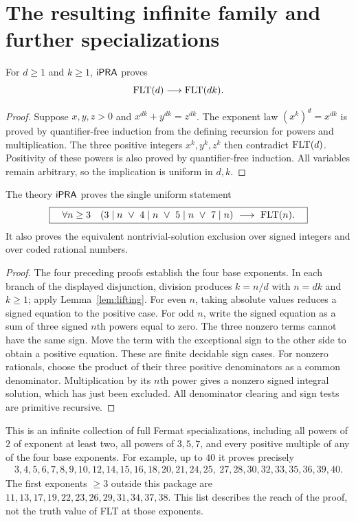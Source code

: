 \section{The resulting infinite family and further specializations}
\label{sec:coverage}

\begin{lemma}\label{lem:lifting}
For $d\geq1$ and $k\geq1$, $\mathsf{iPRA}$ proves
\[
 \operatorname{FLT}(d)\longrightarrow\operatorname{FLT}(dk).
\]
\end{lemma}

\begin{proof}
Suppose $x,y,z>0$ and $x^{dk}+y^{dk}=z^{dk}$. The exponent law
$(x^k)^d=x^{dk}$ is proved by quantifier-free induction from the defining
recursion for powers and multiplication. The three positive integers
$x^k,y^k,z^k$ then contradict $\operatorname{FLT}(d)$. Positivity of these powers is
also proved by quantifier-free induction. All variables remain arbitrary,
so the implication is uniform in $d,k$.
\end{proof}

\begin{theorem}\label{thm:main}
The theory $\mathsf{iPRA}$ proves the single uniform statement
\[
 \boxed{\quad
 \forall n\geq3\quad
 (3\mid n\ \vee\ 4\mid n\ \vee\ 5\mid n\ \vee\ 7\mid n)
 \ \longrightarrow\ \operatorname{FLT}(n).
 \quad}
\]
It also proves the equivalent nontrivial-solution exclusion over signed
integers and over coded rational numbers.
\end{theorem}

\begin{proof}
The four preceding proofs establish the four base exponents. In each
branch of the displayed disjunction, division produces $k=n/d$ with
$n=dk$ and $k\geq1$; apply Lemma~\ref{lem:lifting}.
For even $n$, taking absolute values reduces a signed equation to the
positive case. For odd $n$, write the signed equation as a sum of three
signed $n$th powers equal to zero. The three nonzero terms cannot have
the same sign. Move the term with the exceptional sign to the other side
to obtain a positive equation. These are finite decidable sign cases.
For nonzero rationals, choose the product of their three positive
denominators as a common denominator. Multiplication by its $n$th power
gives a nonzero signed integral solution, which has just been excluded.
All denominator clearing and sign tests are primitive recursive.
\end{proof}

This is an infinite collection of full Fermat specializations, including
all powers of $2$ of exponent at least two, all powers of $3,5,7$, and
every positive multiple of any of the four base exponents. For example,
up to $40$ it proves precisely
\[
 \begin{gathered}
 3,4,5,6,7,8,9,10,12,14,15,16,18,20,21,24,25,\
 27,28,30,32,33,35,36,39,40.
 \end{gathered}
\]
The first exponents $\geq3$ outside this package are
$11,13,17,19,22,23,26,29,31,34,37,38$.
This list describes the reach of the proof, not the truth value of FLT
at those exponents.

